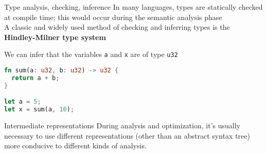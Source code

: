 \documentclass[../index.tex]{subfiles}
\begin{document}
\renewcommand{\currenttitle}{Type analysis, checking, inference}
\begin{frame}[fragile]{\currenttitle}
  In many languages, types are statically checked at compile time; this would
  occur during the semantic analysis phase \\[2em]

  A classic and widely used method of checking and inferring types is the
  \textbf{Hindley-Milner type system}

  We can infer that the variables \texttt{a} and \texttt{x} are of type
  \texttt{u32} 

  \begin{lstlisting}[language=Rust, xleftmargin=5mm]
fn sum(a: u32, b: u32) -> u32 {
  return a + b;
}

let a = 5;
let x = sum(a, 10);
  \end{lstlisting}
\end{frame}
  
\renewcommand{\currenttitle}{Intermediate representations}
\begin{frame}[fragile]{\currenttitle}
  During analysis and optimization, it's usually necessary to use different
  representations (other than an abstract syntax tree) more conducive to
  different kinds of analysis.

  
\end{frame}
  
\renewcommand{\currenttitle}{}
\begin{frame}[fragile]{\currenttitle}
\end{frame}

\end{document}
